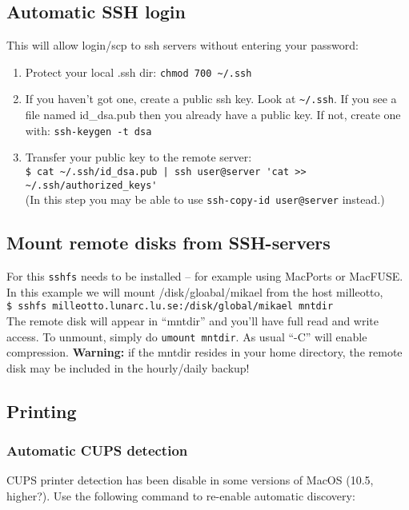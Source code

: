 \documentclass[a4paper,10pt]{article}
\begin{document}
\subsection{Automatic SSH login}
This will allow login/scp to ssh servers without entering your password:
\begin{enumerate}
\item Protect your local .ssh dir: \verb"chmod 700 ~/.ssh"

\item If you haven't got one, create a public ssh key.
Look at \verb"~/.ssh". If you see a file named id\_dsa.pub then you already have a public key. If not, create one with: \verb"ssh-keygen -t dsa"

\item Transfer your public key to the remote server:\\

\verb"$ cat ~/.ssh/id_dsa.pub | ssh user@server 'cat >> ~/.ssh/authorized_keys'"\\

(In this step you may be able to use \verb"ssh-copy-id user@server" instead.)
\end{enumerate}

\subsection{Mount remote disks from SSH-servers}
For this \verb+sshfs+ needs to be installed -- for example using MacPorts or MacFUSE. In this example we will mount /disk/gloabal/mikael from the host milleotto,\\

\verb+$ sshfs milleotto.lunarc.lu.se:/disk/global/mikael mntdir+\\

\noindent The remote disk will appear in ``mntdir'' and you'll have full read and write access. To unmount, simply do \verb+umount mntdir+. As usual ``-C'' will enable compression. \textbf{Warning:} if the mntdir resides in your home directory, the remote disk may be included in the hourly/daily backup!

\subsection{Printing}
\subsubsection{Automatic CUPS detection}
CUPS printer detection has been disable in some versions of MacOS (10.5, higher?). Use the following command to re-enable automatic discovery:\\
\end{document}
